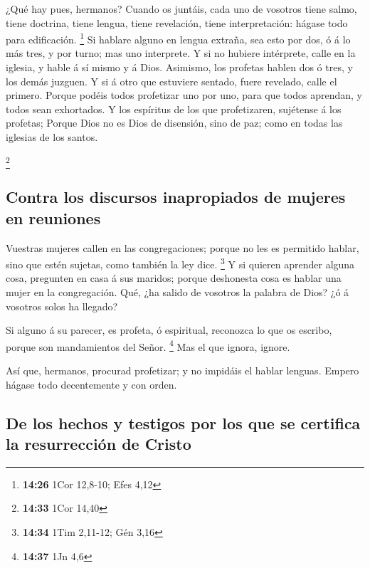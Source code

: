  ¿Qué hay pues, hermanos? Cuando os juntáis, cada uno de
vosotros tiene salmo, tiene doctrina, tiene lengua, tiene revelación,
tiene interpretación: hágase todo para edificación. \footnote{\textbf{14:26}
  1Cor 12,8-10; Efes 4,12}  Si hablare alguno en lengua
extraña, sea esto por dos, ó á lo más tres, y por turno; mas uno
interprete.  Y si no hubiere intérprete, calle en la
iglesia, y hable á sí mismo y á Dios.  Asimismo, los
profetas hablen dos ó tres, y los demás juzguen.  Y si á
otro que estuviere sentado, fuere revelado, calle el primero.
 Porque podéis todos profetizar uno por uno, para que
todos aprendan, y todos sean exhortados.  Y los espíritus
de los que profetizaren, sujétense á los profetas; 
Porque Dios no es Dios de disensión, sino de paz; como en todas las
iglesias de los santos.

\footnote{\textbf{14:33} 1Cor 14,40}

\hypertarget{contra-los-discursos-inapropiados-de-mujeres-en-reuniones}{%
\subsection{Contra los discursos inapropiados de mujeres en
reuniones}\label{contra-los-discursos-inapropiados-de-mujeres-en-reuniones}}

 Vuestras mujeres callen en las congregaciones; porque no
les es permitido hablar, sino que estén sujetas, como también la ley
dice. \footnote{\textbf{14:34} 1Tim 2,11-12; Gén 3,16}  Y
si quieren aprender alguna cosa, pregunten en casa á sus maridos; porque
deshonesta cosa es hablar una mujer en la congregación. 
Qué, ¿ha salido de vosotros la palabra de Dios? ¿ó á vosotros solos ha
llegado?

 Si alguno á su parecer, es profeta, ó espiritual,
reconozca lo que os escribo, porque son mandamientos del Señor.
\footnote{\textbf{14:37} 1Jn 4,6}  Mas el que ignora,
ignore.

 Así que, hermanos, procurad profetizar; y no impidáis el
hablar lenguas.  Empero hágase todo decentemente y con
orden.

\hypertarget{de-los-hechos-y-testigos-por-los-que-se-certifica-la-resurrecciuxf3n-de-cristo}{%
\subsection{De los hechos y testigos por los que se certifica la
resurrección de
Cristo}\label{de-los-hechos-y-testigos-por-los-que-se-certifica-la-resurrecciuxf3n-de-cristo}}

